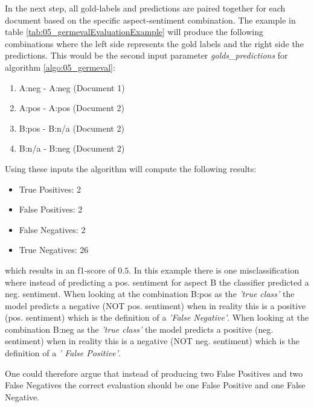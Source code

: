 In the next step, all gold-labels and predictions are paired together for each document based on the specific aspect-sentiment combination. The example in table \ref{tab:05_germevalEvaluationExample} will produce the following combinations where the left side represents the gold labels and the right side the predictions. This would be the second input parameter \textit{golds\_predictions} for algorithm \ref{algo:05_germeval}: 

\begin{enumerate}
	\item A:neg - A:neg (Document 1)
	\item A:pos - A:pos (Document 2)
	\item B:pos - B:n/a (Document 2)
	\item B:n/a - B:neg (Document 2)
\end{enumerate}

Using these inputs the algorithm will compute the following results:

\begin{itemize}
	\item True Positives: 2
	\item False Positives: 2
	\item False Negatives: 2
	\item True Negatives: 26
\end{itemize}

which results in an f1-score of $0.5$. In this example there is one misclassification where instead of predicting a pos. sentiment for aspect B the classifier predicted a neg. sentiment. When looking at the combination B:pos as the \textit{'true class'} the model predicts a negative {(NOT pos. sentiment)} when in reality this is a positive {(pos. sentiment)} which is the definition of a \textit{'False Negative'}. When looking at the combination B:neg as the \textit{'true class'} the model predicts a positive {(neg. sentiment)} when in reality this is a negative {(NOT neg. sentiment)} which is the definition of a \textit{' False Positive'}.

One could therefore argue that instead of producing two False Positives and two False Negatives the correct evaluation should be one False Positive and one False Negative.


